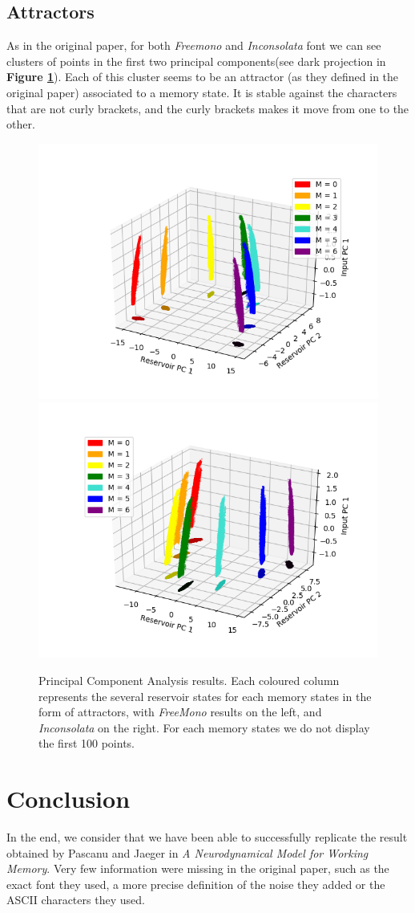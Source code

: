 \subsection{Attractors}

As in the original paper, for both \textit{Freemono} and \textit{Inconsolata} font we can see clusters of points in the first two principal components(see dark projection in \textbf{Figure \ref{fig:PCA}}). Each of this cluster seems to be an attractor (as they defined in the original paper) associated to a memory state. It is stable against the characters that are not curly brackets, and the curly brackets makes it move from one to the other.

\begin{figure}[h]
    \centering
    \includegraphics[width = .45\linewidth]{data/FreeMono_PCA.png}
    \includegraphics[width = .45\linewidth]{data/Inconsolata_PCA.png}
    \caption{Principal Component Analysis results. Each coloured column represents the several reservoir states for each memory states in the form of attractors, with \textit{FreeMono} results on the left, and \textit{Inconsolata} on the right. For each memory states we do not display the first 100 points.}
    \label{fig:PCA}
\end{figure}

\section{Conclusion}

In the end, we consider that we have been able to successfully replicate the result obtained by Pascanu and Jaeger in \textit{A Neurodynamical Model for Working Memory}.
Very few information were missing in the original paper, such as the exact font they used, a more precise definition of the noise they added or the ASCII characters they used.
